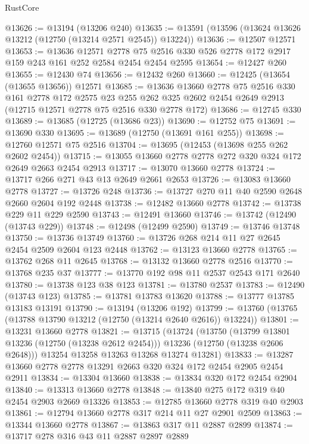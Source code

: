 \begin{lexlean}{RustCore}
\begin{coremodule}
@13626 := @13194 (@13206 @240)
@13635 := @13591 (@13596 (@13624 @13626 @13212 (@12750 (@13214 @2571 @2545)) @13224))
@13636 := @12507 @12571
@13653 := @13636
    @12571
    @2778
    @75
    @2516
    @330
    @526
    @2778
    @172
    @2917
    @159
    @243
    @161
    @252
    @2584
    @2454
    @2454
    @2595
@13654 := @12427 @260
@13655 := @12430 @74
@13656 := @12432 @260
@13660 := @12425 (@13654 (@13655 @13656)) @12571
@13685 := @13636
    @13660
    @2778
    @75
    @2516
    @330
    @161
    @2778
    @172
    @2575
    @23
    @255
    @262
    @325
    @2602
    @2454
    @2649
    @2913
    (@12715 @12571 @2778 @75 @2516 @330 @2778 @172)
@13686 := @12745 @330
@13689 := @13685 (@12725 (@13686 @23))
@13690 := @12752 @75
@13691 := @13690 @330
@13695 := @13689 (@12750 (@13691 @161 @255))
@13698 := @12760 @12571 @75 @2516
@13704 := @13695 (@12453 (@13698 @255 @262 @2602 @2454))
@13715 := @13055 @13660 @2778 @2778 @272 @320 @324 @172 @2649 @2663 @2454 @2913
@13717 := @13070 @13660 @2778
@13724 := @13717 @266 @271 @43 @13 @2649 @2661 @2653
@13726 := @13083 @13660 @2778
@13727 := @13726 @248
@13736 := @13727 @270 @11 @40 @2590 @2648 @2660 @2604 @192 @2448
@13738 := @12482 @13660 @2778
@13742 := @13738 @229 @11 @229 @2590
@13743 := @12491 @13660
@13746 := @13742 (@12490 (@13743 @229))
@13748 := @12498 (@12499 @2590)
@13749 := @13746 @13748
@13750 := @13736 @13749
@13760 := @13726 @268 @214 @11 @27 @2645 @2454 @2509 @2604 @123 @2448
@13762 := @13123 @13660 @2778
@13765 := @13762 @268 @11 @2645
@13768 := @13132 @13660 @2778 @2516
@13770 := @13768 @235 @37
@13777 := @13770 @192 @98 @11 @2537 @2543 @171 @2640
@13780 := @13738 @123 @38 @123
@13781 := @13780 @2537
@13783 := @12490 (@13743 @123)
@13785 := @13781 @13783 @13620
@13788 := @13777 @13785 @13183 @13191
@13790 := @13194 (@13206 @192)
@13799 := @13760 (@13765 (@13788 @13790 @13212 (@12750 (@13214 @2640 @2616)) @13224))
@13801 := @13231 @13660 @2778
@13821 := @13715
    (@13724
      (@13750
        (@13799 @13801 @13236 (@12750 (@13238 @2612 @2454)))
        @13236
        (@12750 (@13238 @2606 @2648)))
      @13254
      @13258
      @13263
      @13268
      @13274
      @13281)
@13833 := @13287 @13660 @2778 @2778 @13291 @2663 @320 @324 @172 @2454 @2905 @2454 @2911
@13834 := @13304 @13660
@13838 := @13834 @320 @172 @2454 @2904
@13840 := @13313 @13660 @2778
@13848 := @13840 @275 @172 @319 @40 @2454 @2903 @2669 @13326
@13853 := @12785 @13660 @2778 @319 @40 @2903
@13861 := @12794 @13660 @2778 @317 @214 @11 @27 @2901 @2509
@13863 := @13344 @13660 @2778
@13867 := @13863 @317 @11 @2887 @2899
@13874 := @13717 @278 @316 @43 @11 @2887 @2897 @2889

\end{coremodule}
\end{lexlean}
